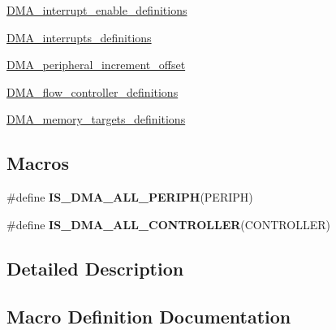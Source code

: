 \begin{DoxyCompactItemize}
\item 
\hyperlink{group___d_m_a__interrupt__enable__definitions}{D\+M\+A\+\_\+interrupt\+\_\+enable\+\_\+definitions}
\item 
\hyperlink{group___d_m_a__interrupts__definitions}{D\+M\+A\+\_\+interrupts\+\_\+definitions}
\item 
\hyperlink{group___d_m_a__peripheral__increment__offset}{D\+M\+A\+\_\+peripheral\+\_\+increment\+\_\+offset}
\item 
\hyperlink{group___d_m_a__flow__controller__definitions}{D\+M\+A\+\_\+flow\+\_\+controller\+\_\+definitions}
\item 
\hyperlink{group___d_m_a__memory__targets__definitions}{D\+M\+A\+\_\+memory\+\_\+targets\+\_\+definitions}
\end{DoxyCompactItemize}
\subsection*{Macros}
\begin{DoxyCompactItemize}
\item 
\#define {\bfseries I\+S\+\_\+\+D\+M\+A\+\_\+\+A\+L\+L\+\_\+\+P\+E\+R\+I\+P\+H}(P\+E\+R\+I\+P\+H)
\item 
\#define {\bfseries I\+S\+\_\+\+D\+M\+A\+\_\+\+A\+L\+L\+\_\+\+C\+O\+N\+T\+R\+O\+L\+L\+E\+R}(C\+O\+N\+T\+R\+O\+L\+L\+E\+R)
\end{DoxyCompactItemize}


\subsection{Detailed Description}


\subsection{Macro Definition Documentation}
\hypertarget{group___d_m_a___exported___constants_gaad08400369c8c129927cdb9cf1baae29}{}
